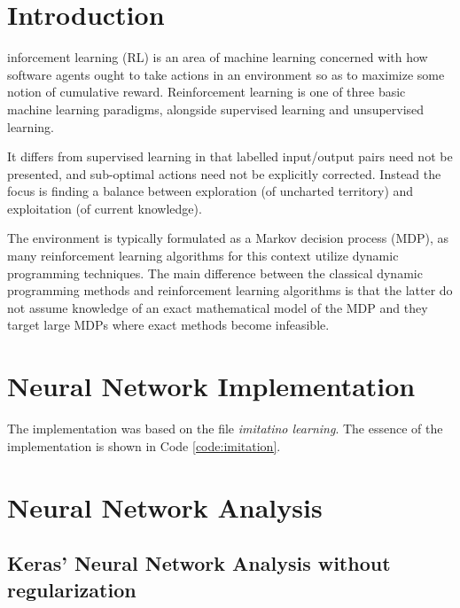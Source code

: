 \documentclass[journal]{IEEEtran}
\begin{document}
\section{Introduction}

inforcement learning (RL) is an area of machine learning
concerned with how software agents ought to take actions in an environment so
as to maximize some notion of cumulative reward. Reinforcement learning is one
of three basic machine learning paradigms, alongside supervised learning
and unsupervised learning.

It differs from supervised learning in that labelled input/output pairs need
not be presented, and sub-optimal actions need not be explicitly corrected.
Instead the focus is finding a balance between exploration (of uncharted
territory) and exploitation (of current knowledge).

The environment is typically formulated as a Markov decision process (MDP),
as many reinforcement learning algorithms for this context utilize dynamic
programming techniques. The main difference between the classical dynamic
programming methods and reinforcement learning algorithms is that the latter
do not assume knowledge of an exact mathematical model of the MDP and they
target large MDPs where exact methods become infeasible.

\section{Neural Network Implementation}

The implementation was based on the file \textit{imitatino learning}. The essence of the implementation is shown in Code \ref{code:imitation}.



\section{Neural Network Analysis}

\subsection{Keras' Neural Network Analysis without regularization}
\end{document}
